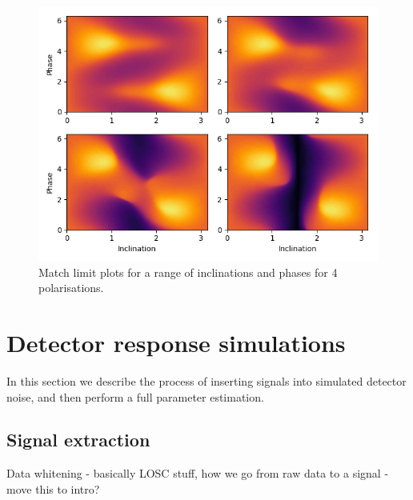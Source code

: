 \documentclass[11pt]{article}
\begin{document}
\begin{figure}[h]
	\includegraphics[scale=0.85]{fig12.png}
	\centering
	\caption{Match limit plots for a range of inclinations and phases for 4 polarisations.}
	\centering
\end{figure}

\section{Detector response simulations}
In this section we describe the process of inserting signals into simulated detector noise, and then perform a full parameter estimation.
\subsection{Signal extraction}
Data whitening - basically LOSC stuff, how we go from raw data to a signal - move this to intro?
\end{document}
